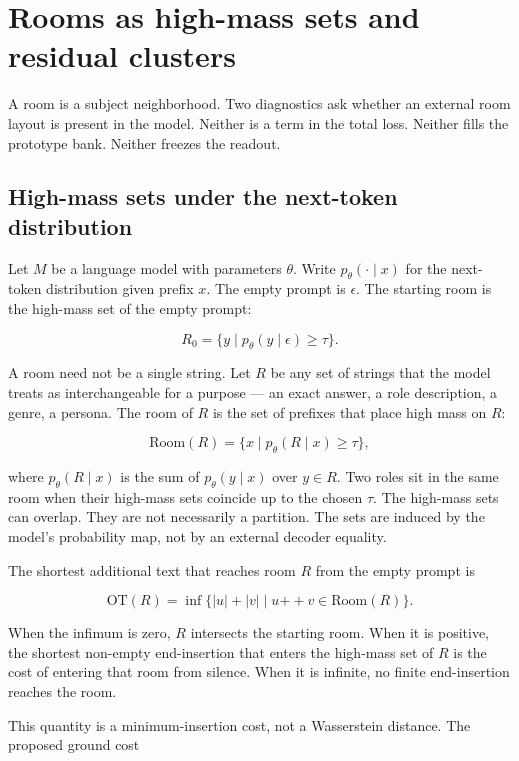 \documentclass[11pt,a4paper]{article}
\begin{document}
\section{Rooms as high-mass sets and residual clusters}

A room is a subject neighborhood. Two diagnostics ask whether an
external room layout is present in the model. Neither is a term in the
total loss. Neither fills the prototype bank. Neither freezes the
readout.

\subsection{High-mass sets under the next-token distribution}

Let \(M\) be a language model with parameters \(\theta\). Write
\(p_\theta(\cdot\mid x)\) for the next-token distribution given prefix
\(x\). The empty prompt is \(\epsilon\). The starting room is the
high-mass set of the empty prompt:

\[
R_0 = \{ y \mid p_\theta(y\mid\epsilon)\ge\tau \}.
\]

A room need not be a single string. Let \(R\) be any set of strings that
the model treats as interchangeable for a purpose --- an exact answer, a
role description, a genre, a persona. The room of \(R\) is the set of
prefixes that place high mass on \(R\):

\[
\mathrm{Room}(R) = \{ x \mid p_\theta(R\mid x)\ge\tau \},
\]

where \(p_\theta(R\mid x)\) is the sum of \(p_\theta(y\mid x)\) over
\(y \in R\). Two roles sit in the same room when their high-mass sets
coincide up to the chosen \(\tau\). The high-mass sets can overlap. They
are not necessarily a partition. The sets are induced by the model's
probability map, not by an external decoder equality.

The shortest additional text that reaches room \(R\) from the empty
prompt is

\[
\mathrm{OT}(R) = \inf\{ |u|+|v| \mid u \mathbin{+\!\!+} v\in\mathrm{Room}(R) \}.
\]

When the infimum is zero, \(R\) intersects the starting room. When it is
positive, the shortest non-empty end-insertion that enters the high-mass
set of \(R\) is the cost of entering that room from silence. When it is
infinite, no finite end-insertion reaches the room.

This quantity is a minimum-insertion cost, not a Wasserstein distance.
The proposed ground cost
\end{document}
